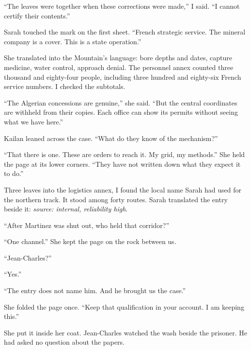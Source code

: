 ``The leaves were together when these corrections were made,'' I said. ``I cannot certify their contents.''\par

Sarah touched the mark on the first sheet. ``French strategic service. The mineral company is a cover. This is a state operation.''\par

She translated into the Mountain's language: bore depths and dates, capture medicine, water control, approach denial. The personnel annex counted three thousand and eighty-four people, including three hundred and eighty-six French service numbers. I checked the subtotals.\par

``The Algerian concessions are genuine,'' she said. ``But the central coordinates are withheld from their copies. Each office can show its permits without seeing what we have here.''\par

Kailan leaned across the case. ``What do they know of the mechanism?''\par

``That there is one. These are orders to reach it. My grid, my methods.'' She held the page at its lower corners. ``They have not written down what they expect it to do.''\par

Three leaves into the logistics annex, I found the local name Sarah had used for the northern track. It stood among forty routes. Sarah translated the entry beside it: \emph{source: internal, reliability high}.\par

``After Martinez was shut out, who held that corridor?''\par

``One channel.'' She kept the page on the rock between us.\par

``Jean-Charles?''\par

``Yes.''\par

``The entry does not name him. And he brought us the case.''\par

She folded the page once. ``Keep that qualification in your account. I am keeping this.''\par

She put it inside her coat. Jean-Charles watched the wash beside the prisoner. He had asked no question about the papers.\par

